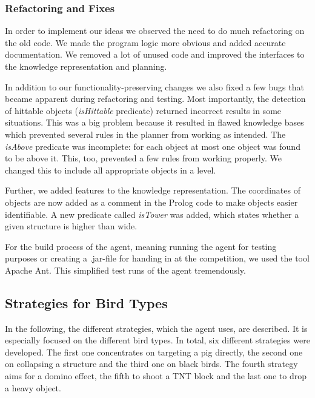 \documentclass[a4paper, pdftex, ngerman]{article}
\begin{document}
\subsubsection{Refactoring and Fixes}
\label{sec:refandfix}


In order to implement our ideas we observed the need to do much
refactoring on the old code. We made the program logic
more obvious and added accurate documentation. We removed a lot of unused code
and improved the interfaces to the knowledge representation and planning.

In addition to our functionality-preserving changes we also fixed a few bugs
that became apparent during refactoring and testing. Most importantly, the
detection of hittable objects (\emph{isHittable} predicate) returned incorrect
results in some situations. This was a big problem because it resulted in
flawed knowledge bases which prevented several rules in the planner from
working as intended. The \emph{isAbove} predicate was incomplete: for each
object at most one object was found to be above it. This, too, prevented a few
rules from working properly. We changed this to include all appropriate
objects in a level.

Further, we added features to the knowledge representation. The coordinates of objects are now added as a comment in the Prolog code to make objects easier identifiable. A new predicate called \emph{isTower} was added, which states whether a given structure is higher than wide.

For the build process of the agent, meaning running the agent for testing purposes or creating a .jar-file for handing in at the competition, we used the tool Apache Ant. This simplified test runs of the agent tremendously.


\subsection{Strategies for Bird Types}
\label{sec:strategies}

In the following, the different strategies, which the agent uses, are described. It is especially focused on the different bird types. In total, six different strategies were developed. The first one concentrates on targeting a pig directly, the second one on collapsing a structure and the third one on black birds. The fourth strategy aims for a domino effect, the fifth to shoot a TNT block and the last one to drop a heavy object.
\end{document}
